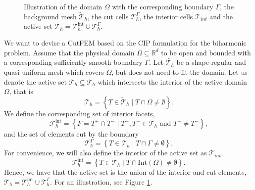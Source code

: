 \documentclass[11pt]{article}
\theoremstyle{remark}
\numberwithin{equation}{section}
\begin{document}
\begin{figure}[h!]
{


}


\caption{Illustration of the domain $\Omega$ with the corresponding boundary $\Gamma$, the background mesh $\widetilde{\mathcal{T}}_{h} $,  the cut cells $\mathcal{T}_{h} ^{\Gamma }$, the interior cells $\mathcal{T} _{int}$ and the active set $\mathcal{T} _{h} =
\mathcal{T}^{ \mathrm{int}  }_{h} \cup \mathcal{T}_{h }^{ \Gamma  }  $. }
\label{fig:background_mesh}
\end{figure}


We want to devise a CutFEM based on the CIP formulation for the biharmonic problem. Assume that the physical domain $\Omega \subseteq    \mathbb{R} ^d$ to be open and bounded with a corresponding sufficiently smooth boundary $\Gamma  $.
 Let $\widetilde{\mathcal{T}_{h} } $ be a shape-regular and quasi-uniform mesh which covers $\Omega $, but does not need to fit the
domain. Let us denote the active set $\mathcal{T} _{h} \subseteq \widetilde{\mathcal{T}_{h}}$ which intersects the interior of the active domain $\Omega $, that is
\begin{equation}
\label{eq:active_set}
\mathcal{T} _{h} = \left\{ T \in \widetilde{\mathcal{T} }_{h}  \mid  T \cap \Omega   \neq \emptyset    \right\}.
\end{equation}
We define the corresponding set of interior facets, \[
    \mathcal{F} _{h}^{\mathrm{int} } = \left\{ F = T^{+} \cap T^{-}  \mid  T^{+}, T^{-} \in \mathcal{T} _{h} \text{ and } T^{+} \neq T^{-} \right\},
\]
and the set of elements cut by the boundary \[
\mathcal{T}_{h} ^{\Gamma } = \left\{ T \in \mathcal{T} _{h}   \mid  T \cap \Gamma \neq \emptyset  \right\}.
\]
For convenience, we will also define the interior of the active set as $\mathcal{T} _{int}$.
\[
\mathcal{T} ^{\mathrm{int} }_{h} = \left\{ T \in \mathcal{T} _{h}   \mid  T \cap  \mathrm{Int}(\Omega ) \neq \emptyset  \right\}.
\]
Hence, we have that the active set is the union of the interior and cut elements, $\mathcal{T} _{h} = \mathcal{T}_{h} ^{\mathrm{int} } \cup  \mathcal{T} ^{\Gamma }_{h}$. For an illustration, see Figure \ref{fig:background_mesh}.
\end{document}
